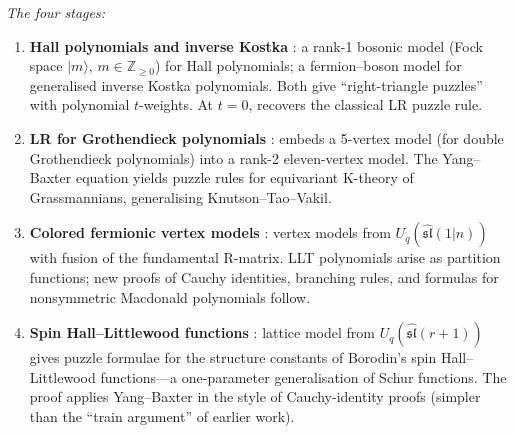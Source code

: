 \documentclass[11pt]{article}
\theoremstyle{plain}
\theoremstyle{definition}
\theoremstyle{remark}
\newcommand{\Z}{\mathbb{Z}}
\begin{document}
\begin{enumerate}
  \smallskip\noindent\emph{The four stages:}
  \begin{enumerate}
  \item[(a)] \textbf{Hall polynomials and inverse Kostka}
    \cite{wheeler-zinn-justin-2016}:
    a rank-1 bosonic model (Fock space $|m\rangle$, $m \in \Z_{\geqslant 0}$)
    for Hall polynomials; a fermion--boson model for generalised
    inverse Kostka polynomials. Both give ``right-triangle
    puzzles'' with polynomial $t$-weights.
    At $t = 0$, recovers the classical LR puzzle rule.
  \item[(b)] \textbf{LR for Grothendieck polynomials}
    \cite{wheeler-zinn-justin-2016b}:
    embeds a 5-vertex model (for double Grothendieck polynomials)
    into a rank-2 eleven-vertex model.  The Yang--Baxter equation
    yields puzzle rules for equivariant K-theory of Grassmannians,
    generalising Knutson--Tao--Vakil.
  \item[(c)] \textbf{Colored fermionic vertex models}
    \cite{aggarwal-borodin-wheeler-2021}:
    vertex models from $U_q(\widehat{\mathfrak{sl}}(1|n))$
    with fusion of the fundamental R-matrix.
    LLT polynomials arise as partition functions; new proofs
    of Cauchy identities, branching rules, and formulas for
    nonsymmetric Macdonald polynomials follow.
  \item[(d)] \textbf{Spin Hall--Littlewood functions}
    \cite{gunna-wheeler-zinn-justin-2025}:
    lattice model from $U_q(\widehat{\mathfrak{sl}}(r{+}1))$
    gives puzzle formulae for the structure constants of
    Borodin's spin Hall--Littlewood functions---a
    one-parameter generalisation of Schur functions.
    The proof applies Yang--Baxter in the style of
    Cauchy-identity proofs (simpler than the ``train
    argument'' of earlier work).
  \end{enumerate}


\end{enumerate}
\end{document}
